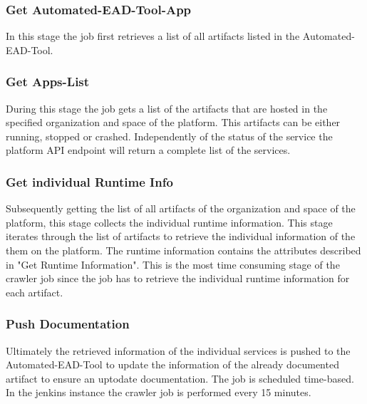 
\subsubsection{Get Automated-EAD-Tool-App}

In this stage the job first retrieves a list of all artifacts listed in the Automated-EAD-Tool. 

\subsubsection{Get Apps-List} 
During this stage the job gets a list of the artifacts that are hosted in the specified organization and space of the platform. This artifacts can be either running, stopped or crashed. Independently of the status of the service the platform API endpoint will return a complete list of the services.

\subsubsection{Get individual Runtime Info}
Subsequently getting the list of all artifacts of the organization and space of the platform, this stage collects the individual runtime information. This stage iterates through the list of artifacts to retrieve the individual information of the them on the platform. The runtime information contains the attributes described in "Get Runtime Information". This is the most time consuming stage of the crawler job since the job has to retrieve the individual runtime information for each artifact.

\subsubsection{Push Documentation}
Ultimately the retrieved information of the individual services is pushed to the Automated-EAD-Tool to update the information of the already documented artifact to ensure an uptodate documentation.
The job is scheduled time-based. In the jenkins instance the crawler job is performed every 15 minutes.

